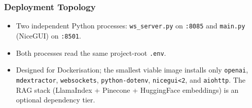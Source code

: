 \documentclass{article}
\begin{document}
\subsubsection{Deployment Topology}
\begin{itemize}
    \item Two independent Python processes: \texttt{ws\_server.py} on \texttt{:8085} and \texttt{main.py} (NiceGUI) on \texttt{:8501}.
    \item Both processes read the same project-root \texttt{.env}.
    \item Designed for Dockerisation; the smallest viable image installs only \texttt{openai}, \texttt{mdextractor}, \texttt{websockets}, \texttt{python-dotenv}, \texttt{nicegui<2}, and \texttt{aiohttp}. The RAG stack (LlamaIndex + Pinecone + HuggingFace embeddings) is an optional dependency tier.
\end{itemize}
\end{document}
